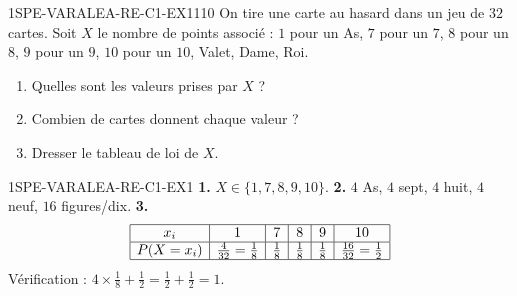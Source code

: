 
\begin{exercice}{1SPE-VARALEA-RE-C1-EX1}{1}{10}
On tire une carte au hasard dans un jeu de $32$ cartes. Soit $X$ le nombre de points associé : $1$ pour un As, $7$ pour un $7$, $8$ pour un $8$, $9$ pour un $9$, $10$ pour un $10$, Valet, Dame, Roi.
\begin{enumerate}
  \item Quelles sont les valeurs prises par $X$ ?
  \item Combien de cartes donnent chaque valeur ?
  \item Dresser le tableau de loi de $X$.
\end{enumerate}
\end{exercice}


\begin{corrige}{1SPE-VARALEA-RE-C1-EX1}
\textbf{1.} $X \in \{1, 7, 8, 9, 10\}$.
\textbf{2.} $4$ As, $4$ sept, $4$ huit, $4$ neuf, $16$ figures/dix.
\textbf{3.}
\[
\begin{array}{|c|c|c|c|c|c|}
\hline
x_i & 1 & 7 & 8 & 9 & 10 \\
\hline
P(X=x_i) & \frac{4}{32}=\frac{1}{8} & \frac{1}{8} & \frac{1}{8} & \frac{1}{8} & \frac{16}{32}=\frac{1}{2} \\
\hline
\end{array}
\]
Vérification : $4 \times \frac{1}{8} + \frac{1}{2} = \frac{1}{2}+\frac{1}{2} = 1$. \checkmark
\end{corrige}
